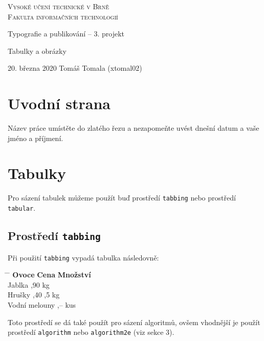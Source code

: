 \documentclass[a4paper, 11pt]{article}
\begin{document}
 \begin{titlepage} 
    \begin{center}
        \thispagestyle{empty}
        \Huge \textsc{Vysoké učení technické v Brně}\\
        \huge \textsc{Fakulta informačních technologií}


        \LARGE Typografie a publikování – 3. projekt

        \Huge Tabulky a obrázky
        \end{center}
    {\Large 20. března 2020  \hfill Tomáš Tomala (xtomal02)}
 \end{titlepage}
    \newpage
\section{Uvodní strana}
        Název práce umístěte do zlatého řezu a nezapomeňte uvést dnešní datum a vaše jméno a příjmení.
\section{Tabulky}
        Pro sázení tabulek můžeme použít buď prostředí \verb|tabbing| nebo prostředí \verb|tabular|.
    \subsection{Prostředí \texttt{tabbing}}
        Při použití \verb|tabbing| vypadá tabulka následovně:
        \begin{tabbing}
            \hspace{1in} \= \hspace{0.50in}  \= \hspace{0.50in} \kill
            \textbf{Ovoce} \> \textbf{Cena} \> \textbf{Množství}\\ 
            Jablka ,90  kg  \\
            Hrušky ,40 ,5 kg\\
            Vodní melouny ,–  kus \\
        \end{tabbing}
        Toto prostředí se dá také použít pro sázení algoritmů, ovšem vhodnější je použít prostředí \verb|algorithm| nebo \verb|algorithm2e| (viz sekce 3).
\end{document}

